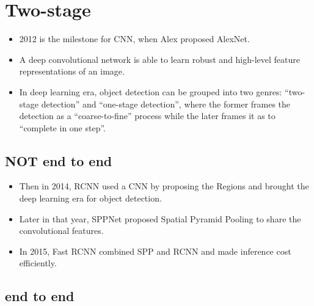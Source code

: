\documentclass{beamer}
\begin{document}
\section{Two-stage}
\begin{frame}
    \begin{itemize}
        \item 2012 is the milestone for CNN, when Alex proposed AlexNet\cite{alexnet}.
        \item A deep convolutional network is able to learn robust and high-level feature representations of an image. 
        \item In deep learning era, object detection can be grouped into two genres: 
        “two-stage detection” and “one-stage detection”, 
        where the former frames the detection as a “coarse-to-fine” process 
        while the later frames it as to “complete in one step”.
    \end{itemize}
\end{frame}

\subsection{NOT end to end}

\begin{frame}
    \begin{itemize}
        \item Then in 2014, RCNN used a CNN by proposing the Regions and brought the deep learning era for object detection.
        \item Later in that year, SPPNet\cite{sppnet} proposed Spatial Pyramid Pooling to share the convolutional features.
        \item In 2015,  Fast RCNN\cite{fast} combined SPP and RCNN and made inference cost efficiently. 
    \end{itemize}
\end{frame}

\subsection{end to end}
\end{document}
